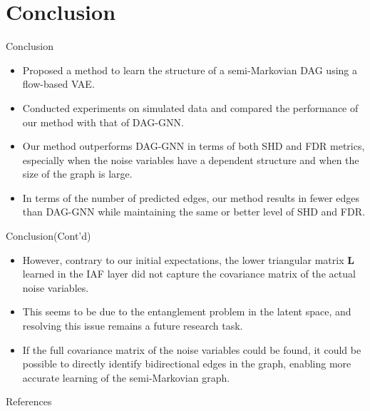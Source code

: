 \documentclass{beamer}
\begin{document}
\section{Conclusion}

\begin{frame}{Conclusion}
    \begin{itemize}
        \item Proposed a method to learn the structure of a semi-Markovian DAG using a flow-based VAE.
        \item Conducted experiments on simulated data and compared the performance of our method with that of DAG-GNN.
        \item Our method outperforms DAG-GNN in terms of both SHD and FDR metrics, especially when the noise variables have a dependent structure and when the size of the graph is large.
        \item In terms of the number of predicted edges, our method results in fewer edges than DAG-GNN while maintaining the same or better level of SHD and FDR. 
    \end{itemize}
\end{frame}

\begin{frame}{Conclusion(Cont'd)}
    \begin{itemize}
        \item However, contrary to our initial expectations, the lower triangular matrix $\mathbf L$ learned in the IAF layer did not capture the covariance matrix of the actual noise variables.
        \item This seems to be due to the entanglement problem in the latent space, and resolving this issue remains a future research task.
        \item If the full covariance matrix of the noise variables could be found, it could be possible to directly identify bidirectional edges in the graph, enabling more accurate learning of the semi-Markovian graph.
    \end{itemize} 
\end{frame}





\begin{frame}[allowframebreaks]{References}
\printbibliography
\end{frame}
\end{document}
